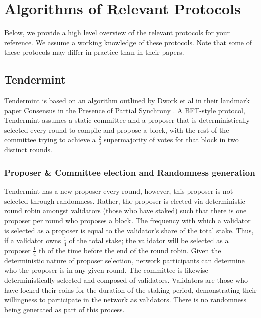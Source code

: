 \documentclass[10pt,journal,compsoc]{IEEEtran}
\begin{document}
\section{Algorithms of Relevant Protocols}
Below, we provide a high level overview of the relevant protocols for your reference. We assume a working knowledge of these protocols. Note that some of these protocols may differ in practice than in their papers.

\subsection{Tendermint}
Tendermint \cite{Buchman} is based on an algorithm outlined by Dwork et al in their landmark paper Consensus in the Presence of Partial Synchrony \cite{DworkEtAl}. A BFT-style protocol, Tendermint assumes a static committee and a proposer that is deterministically selected every round to compile and propose a block, with the rest of the committee trying to achieve a \(\frac{2}{3}\) supermajority of votes for that block in two distinct rounds.

\subsubsection{Proposer \& Committee election and Randomness generation}
Tendermint has a new proposer every round, however, this proposer is not selected through randomness. Rather, the proposer is elected via deterministic round robin amongst validators (those who have staked) such that there is one proposer per round who proposes a block. The frequency with which a validator is selected as a proposer is equal to the validator's share of the total stake. Thus, if a validator owns \(\frac{1}{4}\) of the total stake; the validator will be selected as a proposer \(\frac{1}{4}\) th of the time before the end of the round robin. Given the deterministic nature of proposer selection, network participants can determine who the proposer is in any given round.
The committee is likewise deterministically selected and composed of validators. Validators are those who have locked their coins for the duration of the staking period, demonstrating their willingness to participate in the network as validators. There is no randomness being generated as part of this process.
\end{document}
